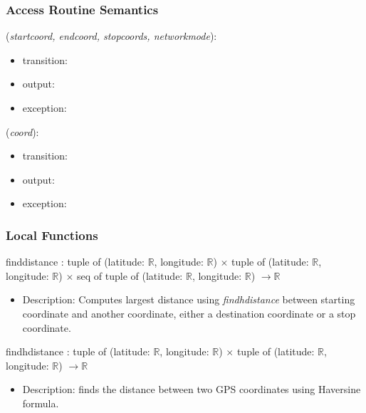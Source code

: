 \documentclass[12pt, titlepage]{article}
\begin{document}
\subsubsection{Access Routine Semantics}

\noindent {}(\emph{startcoord, endcoord, stopcoords, networkmode}):
\begin{itemize}
\item transition:  
\item output:  
\item exception:  
\end{itemize}

\noindent {}(\emph{coord}):
\begin{itemize}
\item transition:  
\item output:  
\item exception: 
\end{itemize}




\subsubsection{Local Functions}

finddistance : tuple of (latitude: $\mathbb{R}$, longitude: $\mathbb{R}$) $\times$ tuple of (latitude: $\mathbb{R}$, longitude: $\mathbb{R}$) $\times$ seq of tuple of (latitude: $\mathbb{R}$, longitude: $\mathbb{R}$) $\rightarrow \mathbb{R}$
\begin{itemize}
    \item Description: Computes largest distance using \emph{findhdistance} between starting coordinate and another coordinate, either a destination coordinate or a stop coordinate.
\end{itemize}
findhdistance : tuple of (latitude: $\mathbb{R}$, longitude: $\mathbb{R}$) $\times$ tuple of (latitude: $\mathbb{R}$, longitude: $\mathbb{R}$) $\rightarrow \mathbb{R}$
\begin{itemize}
    \item Description: finds the distance between two GPS coordinates using Haversine formula. 
\end{itemize}
\end{document}
